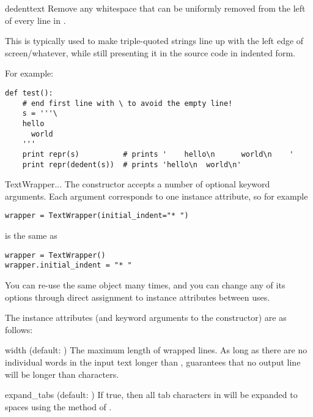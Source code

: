 \begin{funcdesc}{dedent}{text} 
Remove any whitespace that can be uniformly removed from the left
of every line in .

This is typically used to make triple-quoted strings line up with
the left edge of screen/whatever, while still presenting it in the
source code in indented form. 

For example:
\begin{verbatim}
def test():
    # end first line with \ to avoid the empty line!
    s = '''\
    hello
      world
    '''
    print repr(s)          # prints '    hello\n      world\n    '
    print repr(dedent(s))  # prints 'hello\n  world\n'
\end{verbatim}
\end{funcdesc}

\begin{classdesc}{TextWrapper}{...}
The  constructor accepts a number of optional
keyword arguments.  Each argument corresponds to one instance attribute,
so for example
\begin{verbatim}
wrapper = TextWrapper(initial_indent="* ")
\end{verbatim}
is the same as
\begin{verbatim}
wrapper = TextWrapper()
wrapper.initial_indent = "* "
\end{verbatim}

You can re-use the same  object many times, and you
can change any of its options through direct assignment to instance
attributes between uses.
\end{classdesc}

The  instance attributes (and keyword arguments to
the constructor) are as follows:

\begin{memberdesc}{width}
(default: ) The maximum length of wrapped lines.  As long as
there are no individual words in the input text longer than
,  guarantees that no output line
will be longer than \member{width} characters.
\end{memberdesc}

\begin{memberdesc}{expand_tabs}
(default: ) If true, then all tab characters in 
will be expanded to spaces using the \method{expand_tabs()} method of
\var{text}.
\end{memberdesc}

